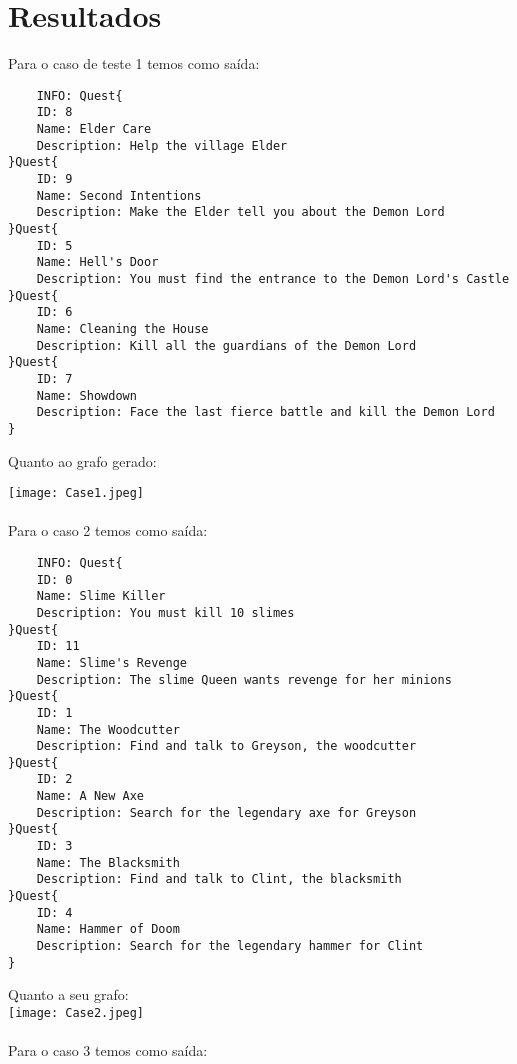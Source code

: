 \documentclass[a4paper, 12pt]{article}
\begin{document}
\newpage
\section{Resultados}
\graphicspath{ {./Results/} }

Para o caso de teste 1 temos como saída:
\begin{verbatim}
    INFO: Quest{
	ID: 8
	Name: Elder Care
	Description: Help the village Elder
}Quest{
	ID: 9
	Name: Second Intentions
	Description: Make the Elder tell you about the Demon Lord
}Quest{
	ID: 5
	Name: Hell's Door
	Description: You must find the entrance to the Demon Lord's Castle
}Quest{
	ID: 6
	Name: Cleaning the House
	Description: Kill all the guardians of the Demon Lord
}Quest{
	ID: 7
	Name: Showdown
	Description: Face the last fierce battle and kill the Demon Lord
}
\end{verbatim}

Quanto ao grafo gerado:

\texttt{[image: Case1.jpeg]}
\\
\\

\newpage
Para o caso 2 temos como saída:

\begin{verbatim}
    INFO: Quest{
	ID: 0
	Name: Slime Killer
	Description: You must kill 10 slimes
}Quest{
	ID: 11
	Name: Slime's Revenge
	Description: The slime Queen wants revenge for her minions
}Quest{
	ID: 1
	Name: The Woodcutter
	Description: Find and talk to Greyson, the woodcutter
}Quest{
	ID: 2
	Name: A New Axe
	Description: Search for the legendary axe for Greyson
}Quest{
	ID: 3
	Name: The Blacksmith
	Description: Find and talk to Clint, the blacksmith
}Quest{
	ID: 4
	Name: Hammer of Doom
	Description: Search for the legendary hammer for Clint
}
\end{verbatim}

Quanto a seu grafo:\\

\texttt{[image: Case2.jpeg]}
\\
\\

\newpage
Para o caso 3 temos como saída:
\end{document}
